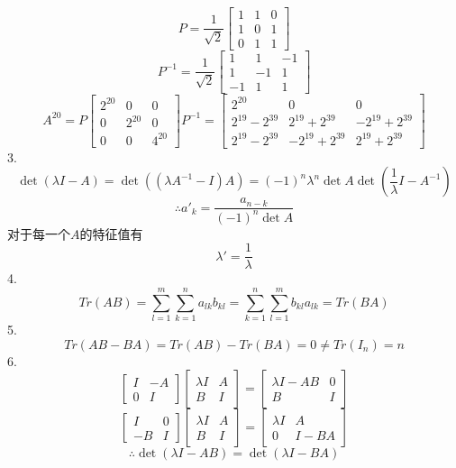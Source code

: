 \documentclass[utf8]{ctexart}
\begin{document}
\[P=\frac{1}{\sqrt{2}}\begin{bmatrix}
	1&1&0\\
	1&0&1\\
	0&1&1
\end{bmatrix}\]
\[P^{-1}=\frac{1}{\sqrt{2}}\begin{bmatrix}
	1&1&-1\\
	1&-1&1\\
	-1&1&1
\end{bmatrix}\]
\[A^{20}=P\begin{bmatrix}
	2^{20}&0&0\\
	0&2^{20}&0\\
	0&0&4^{20}
\end{bmatrix}P^{-1}=\begin{bmatrix}
2^{20}&0&0\\
2^{19}-2^{39}&2^{19}+2^{39}&-2^{19}+2^{39}\\
2^{19}-2^{39}&-2^{19}+2^{39}&2^{19}+2^{39}
\end{bmatrix}\]
3.\\
\[\det(\lambda I-A)=\det((\lambda A^{-1}-I)A)=(-1)^n\lambda^n\det A\det(\frac{1}{\lambda}I-A^{-1})\]
\[\therefore a'_k=\frac{a_{n-k}}{(-1)^n\det A}\]
对于每一个$A$的特征值有
\[\lambda'=\frac{1}{\lambda}\]
4.\\
\[Tr(AB)=\sum\limits_{l=1}^m\sum\limits_{k=1}^na_{lk}b_{kl}=\sum\limits_{k=1}^n\sum\limits_{l=1}^mb_{kl}a_{lk}=Tr(BA)\]
5.\\
\[Tr(AB-BA)=Tr(AB)-Tr(BA)=0\neq Tr(I_n)=n\]
6.\\
\[\begin{bmatrix}
	I&-A\\
	0&I
\end{bmatrix}\begin{bmatrix}
\lambda I&A\\
B&I
\end{bmatrix}=\begin{bmatrix}
\lambda I-AB&0\\
B&I
\end{bmatrix}\]
\[\begin{bmatrix}
	I&0\\
	-B&I
\end{bmatrix}\begin{bmatrix}
	\lambda I&A\\
	B&I
\end{bmatrix}=\begin{bmatrix}
	\lambda I&A\\
	0&I-BA
\end{bmatrix}\]
\[\therefore\det(\lambda I-AB)=\det(\lambda I-BA)\]
\end{document}
